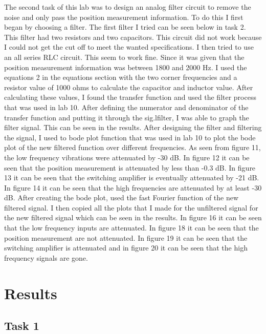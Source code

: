 \documentclass[11pt,a4]{report}
\begin{document}
The second task of this lab was to design an analog filter circuit to remove the noise and only pass the position measurement information. To do this I first began by choosing a filter. The first filter I tried can be seen below in task 2. This filter had two resistors and two capacitors. This circuit did not work because I could not get the cut off to meet the wanted specifications. I then tried to use an all series RLC circuit. This seem to work fine. Since it was given that the position measurement information was between 1800 and 2000 Hz. I used the equations 2 in the equations section with the two corner frequencies and a resistor value of 1000 ohms to calculate the capacitor and inductor value. After calculating these values, I found the transfer function and used the filter process that was used in lab 10. After defining the numerator and denominator of the transfer function and putting it through the sig.lfilter, I was able to graph the filter signal. This can be seen in the results. After designing the filter and filtering the signal, I used to bode plot function that was used in lab 10 to plot the bode plot of the new filtered function over different frequencies. As seen from figure 11, the low frequency vibrations were attenuated by -30 dB. In figure 12 it can be seen that the position measurement is attenuated by less than -0.3 dB. In figure 13 it can be seen that the switching amplifier is eventually attenuated by -21 dB. In figure 14 it can be seen that the high frequencies are attenuated by at least -30 dB. After creating the bode plot, used the fast Fourier function of the new filtered signal. I then copied all the plots that I made for the unfiltered signal for the new filtered signal which can be seen in the results. In figure 16 it can be seen that the low frequency inputs are attenuated. In figure 18 it can be seen that the position measurement are not attenuated. In figure 19 it can be seen that the switching amplifier is attenuated and in figure 20 it can be seen that the high frequency signals are gone. 

\section{Results}
\subsection{Task 1}
\end{document}
